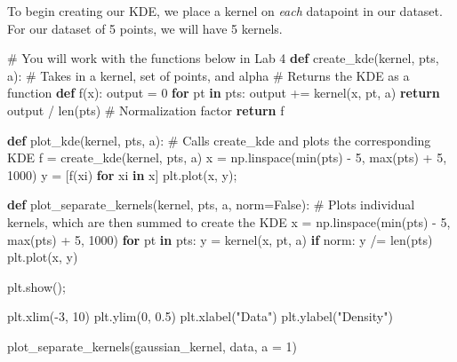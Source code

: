 \documentclass[
  letterpaper,
  DIV=11,
  numbers=noendperiod]{scrreprt}
\newenvironment{Shaded}{\begin{snugshade}}{\end{snugshade}}
\newcommand{\BuiltInTok}[1]{\textcolor[rgb]{0.00,0.23,0.31}{#1}}
\newcommand{\CommentTok}[1]{\textcolor[rgb]{0.37,0.37,0.37}{#1}}
\newcommand{\ControlFlowTok}[1]{\textcolor[rgb]{0.00,0.23,0.31}{\textbf{#1}}}
\newcommand{\DecValTok}[1]{\textcolor[rgb]{0.68,0.00,0.00}{#1}}
\newcommand{\FloatTok}[1]{\textcolor[rgb]{0.68,0.00,0.00}{#1}}
\newcommand{\KeywordTok}[1]{\textcolor[rgb]{0.00,0.23,0.31}{\textbf{#1}}}
\newcommand{\NormalTok}[1]{\textcolor[rgb]{0.00,0.23,0.31}{#1}}
\newcommand{\OperatorTok}[1]{\textcolor[rgb]{0.37,0.37,0.37}{#1}}
\newcommand{\StringTok}[1]{\textcolor[rgb]{0.13,0.47,0.30}{#1}}
\newcommand{\VariableTok}[1]{\textcolor[rgb]{0.07,0.07,0.07}{#1}}
\begin{document}
To begin creating our KDE, we place a kernel on \emph{each} datapoint in
our dataset. For our dataset of 5 points, we will have 5 kernels.

\begin{Shaded}
\begin{Highlighting}[]
\CommentTok{\# You will work with the functions below in Lab 4}
\KeywordTok{def}\NormalTok{ create\_kde(kernel, pts, a):}
    \CommentTok{\# Takes in a kernel, set of points, and alpha}
    \CommentTok{\# Returns the KDE as a function}
    \KeywordTok{def}\NormalTok{ f(x):}
\NormalTok{        output }\OperatorTok{=} \DecValTok{0}
        \ControlFlowTok{for}\NormalTok{ pt }\KeywordTok{in}\NormalTok{ pts:}
\NormalTok{            output }\OperatorTok{+=}\NormalTok{ kernel(x, pt, a)}
        \ControlFlowTok{return}\NormalTok{ output }\OperatorTok{/} \BuiltInTok{len}\NormalTok{(pts) }\CommentTok{\# Normalization factor}
    \ControlFlowTok{return}\NormalTok{ f}

\KeywordTok{def}\NormalTok{ plot\_kde(kernel, pts, a):}
    \CommentTok{\# Calls create\_kde and plots the corresponding KDE}
\NormalTok{    f }\OperatorTok{=}\NormalTok{ create\_kde(kernel, pts, a)}
\NormalTok{    x }\OperatorTok{=}\NormalTok{ np.linspace(}\BuiltInTok{min}\NormalTok{(pts) }\OperatorTok{{-}} \DecValTok{5}\NormalTok{, }\BuiltInTok{max}\NormalTok{(pts) }\OperatorTok{+} \DecValTok{5}\NormalTok{, }\DecValTok{1000}\NormalTok{)}
\NormalTok{    y }\OperatorTok{=}\NormalTok{ [f(xi) }\ControlFlowTok{for}\NormalTok{ xi }\KeywordTok{in}\NormalTok{ x]}
\NormalTok{    plt.plot(x, y)}\OperatorTok{;}
    
\KeywordTok{def}\NormalTok{ plot\_separate\_kernels(kernel, pts, a, norm}\OperatorTok{=}\VariableTok{False}\NormalTok{):}
    \CommentTok{\# Plots individual kernels, which are then summed to create the KDE}
\NormalTok{    x }\OperatorTok{=}\NormalTok{ np.linspace(}\BuiltInTok{min}\NormalTok{(pts) }\OperatorTok{{-}} \DecValTok{5}\NormalTok{, }\BuiltInTok{max}\NormalTok{(pts) }\OperatorTok{+} \DecValTok{5}\NormalTok{, }\DecValTok{1000}\NormalTok{)}
    \ControlFlowTok{for}\NormalTok{ pt }\KeywordTok{in}\NormalTok{ pts:}
\NormalTok{        y }\OperatorTok{=}\NormalTok{ kernel(x, pt, a)}
        \ControlFlowTok{if}\NormalTok{ norm:}
\NormalTok{            y }\OperatorTok{/=} \BuiltInTok{len}\NormalTok{(pts)}
\NormalTok{        plt.plot(x, y)}
    
\NormalTok{    plt.show()}\OperatorTok{;}
    
\NormalTok{plt.xlim(}\OperatorTok{{-}}\DecValTok{3}\NormalTok{, }\DecValTok{10}\NormalTok{)}
\NormalTok{plt.ylim(}\DecValTok{0}\NormalTok{, }\FloatTok{0.5}\NormalTok{)}
\NormalTok{plt.xlabel(}\StringTok{"Data"}\NormalTok{)}
\NormalTok{plt.ylabel(}\StringTok{"Density"}\NormalTok{)}

\NormalTok{plot\_separate\_kernels(gaussian\_kernel, data, a }\OperatorTok{=} \DecValTok{1}\NormalTok{)}
\end{Highlighting}
\end{Shaded}
\end{document}
